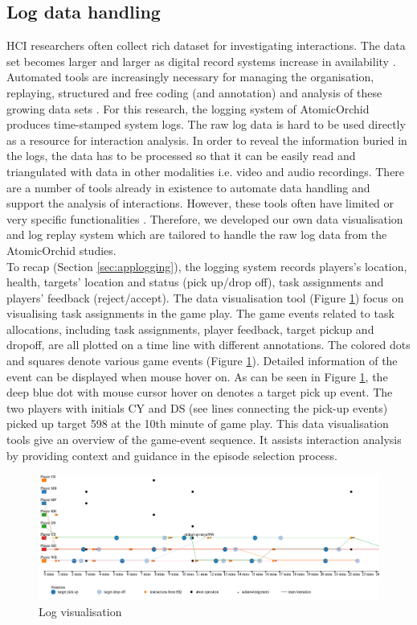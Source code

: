 \subsection{Log data handling} \label{sec:aprloghandling}
\acf{HCI} researchers often collect rich dataset for investigating interactions. The data set becomes larger and larger as digital record systems increase in availability \citep{Brundell}. Automated tools are increasingly necessary for managing the organisation, replaying, structured and free coding (and annotation) and analysis of these growing data sets \citep{Brundell}. For this research, the logging system of AtomicOrchid produces time-stamped system logs. The raw log data is hard to be used directly as a resource for interaction analysis. In order to reveal the information buried in the logs, the data has to be processed so that it can be easily read and triangulated with data in other modalities i.e.  video and audio recordings. There are a number of tools already in existence to automate data handling and support the analysis of interactions. However, these tools often have limited or very specific functionalities \citep{Brundell}. Therefore, we developed our own data visualisation and log replay system which are tailored to handle the raw log data from the AtomicOrchid studies.\\

To recap (Section \ref{sec:applogging}), the logging system records players's location, health, targets' location and status (pick up/drop off), task assignments and players' feedback (reject/accept). The data visualisation tool (Figure \ref{fig:logvis}) focus on visualising task assignments in the game play. The game events related to task allocations, including task assignments, player feedback, target pickup and dropoff, are all plotted on a time line with different annotations. The colored dots and squares denote various game events (Figure \ref{fig:logvis}). Detailed information of the event can be displayed when mouse hover on. As can be seen in Figure \ref{fig:logvis}, the deep blue dot with mouse cursor hover on denotes a target pick up event. The two players with initials CY and DS (see lines connecting the pick-up events) picked up target 598 at the 10th minute of game play. This data visualisation tools give an overview of the game-event sequence. It assists interaction analysis by providing context and guidance in the episode selection process. \\

\begin{figure}[h]
  \centering
  \includegraphics[width=1\textwidth]{img/methodology/logVisualisation}
  \caption{Log visualisation}
  \label{fig:logvis}
\end{figure}


